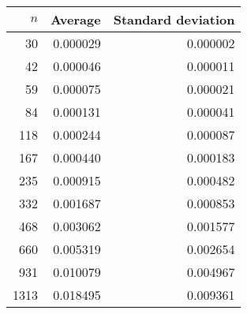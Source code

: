 \begin{tabular}{rrr}
$n$ & Average & Standard deviation\\\hline
30 & 0.000029 & 0.000002\\
42 & 0.000046 & 0.000011\\
59 & 0.000075 & 0.000021\\
84 & 0.000131 & 0.000041\\
118 & 0.000244 & 0.000087\\
167 & 0.000440 & 0.000183\\
235 & 0.000915 & 0.000482\\
332 & 0.001687 & 0.000853\\
468 & 0.003062 & 0.001577\\
660 & 0.005319 & 0.002654\\
931 & 0.010079 & 0.004967\\
1313 & 0.018495 & 0.009361\\
\end{tabular}
